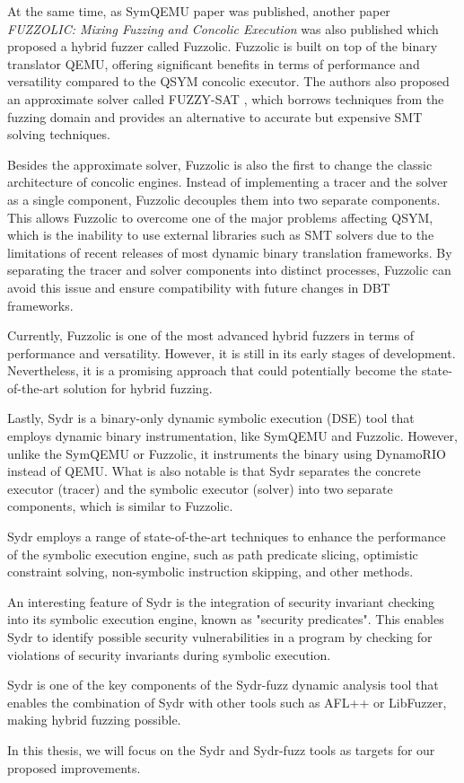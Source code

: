 
At the same time, as SymQEMU paper was published, another paper \textit{FUZZOLIC: Mixing Fuzzing and Concolic Execution} \cite{fuzzolic-hybrid-fuzzer} was also published which proposed a hybrid fuzzer called Fuzzolic. Fuzzolic is built on top of the binary translator QEMU, offering significant benefits in terms of performance and versatility compared to the QSYM concolic executor. The authors also proposed an approximate solver called FUZZY-SAT \cite{fuzzy-sat-fuzzing-symbolic-expressions}, which borrows techniques from the fuzzing domain and provides an alternative to accurate but expensive SMT solving techniques.

Besides the approximate solver, Fuzzolic is also the first to change the classic architecture of concolic engines. Instead of implementing a tracer and the solver as a single component, Fuzzolic decouples them into two separate components. This allows Fuzzolic to overcome one of the major problems affecting QSYM, which is the inability to use external libraries such as SMT solvers due to the limitations of recent releases of most dynamic binary translation frameworks. By separating the tracer and solver components into distinct processes, Fuzzolic can avoid this issue and ensure compatibility with future changes in DBT frameworks.

Currently, Fuzzolic is one of the most advanced hybrid fuzzers in terms of performance and versatility. However, it is still in its early stages of development. Nevertheless, it is a promising approach that could potentially become the state-of-the-art solution for hybrid fuzzing.

 \label{hybrid-fuzzing:sydr}

Lastly, Sydr \cite{sydr-cutting-edge-dynamic-symbolic-execution} is a binary-only dynamic symbolic execution (DSE) tool that employs dynamic binary instrumentation, like SymQEMU and Fuzzolic. However, unlike the SymQEMU or Fuzzolic, it instruments the binary using DynamoRIO instead of QEMU. What is also notable is that Sydr separates the concrete executor (tracer) and the symbolic executor (solver) into two separate components, which is similar to Fuzzolic.

Sydr employs a range of state-of-the-art techniques to enhance the performance of the symbolic execution engine, such as path predicate slicing, optimistic constraint solving, non-symbolic instruction skipping, and other methods.

An interesting feature of Sydr is the integration of security invariant checking into its symbolic execution engine, known as "security predicates". This enables Sydr to identify possible security vulnerabilities in a program by checking for violations of security invariants during symbolic execution.

Sydr is one of the key components of the Sydr-fuzz \cite{sydr-fuzz-ispras-2022} dynamic analysis tool that enables the combination of Sydr with other tools such as AFL++ or LibFuzzer, making hybrid fuzzing possible.

In this thesis, we will focus on the Sydr and Sydr-fuzz tools as targets for our proposed improvements.
